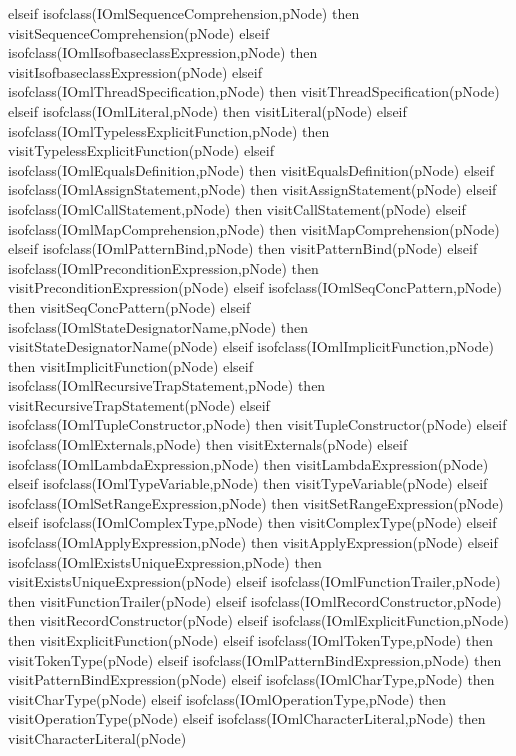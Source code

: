 \begin{vdm_al}
      elseif isofclass(IOmlSequenceComprehension,pNode) then visitSequenceComprehension(pNode)
      elseif isofclass(IOmlIsofbaseclassExpression,pNode) then visitIsofbaseclassExpression(pNode)
      elseif isofclass(IOmlThreadSpecification,pNode) then visitThreadSpecification(pNode)
      elseif isofclass(IOmlLiteral,pNode) then visitLiteral(pNode)
      elseif isofclass(IOmlTypelessExplicitFunction,pNode) then visitTypelessExplicitFunction(pNode)
      elseif isofclass(IOmlEqualsDefinition,pNode) then visitEqualsDefinition(pNode)
      elseif isofclass(IOmlAssignStatement,pNode) then visitAssignStatement(pNode)
      elseif isofclass(IOmlCallStatement,pNode) then visitCallStatement(pNode)
      elseif isofclass(IOmlMapComprehension,pNode) then visitMapComprehension(pNode)
      elseif isofclass(IOmlPatternBind,pNode) then visitPatternBind(pNode)
      elseif isofclass(IOmlPreconditionExpression,pNode) then visitPreconditionExpression(pNode)
      elseif isofclass(IOmlSeqConcPattern,pNode) then visitSeqConcPattern(pNode)
      elseif isofclass(IOmlStateDesignatorName,pNode) then visitStateDesignatorName(pNode)
      elseif isofclass(IOmlImplicitFunction,pNode) then visitImplicitFunction(pNode)
      elseif isofclass(IOmlRecursiveTrapStatement,pNode) then visitRecursiveTrapStatement(pNode)
      elseif isofclass(IOmlTupleConstructor,pNode) then visitTupleConstructor(pNode)
      elseif isofclass(IOmlExternals,pNode) then visitExternals(pNode)
      elseif isofclass(IOmlLambdaExpression,pNode) then visitLambdaExpression(pNode)
      elseif isofclass(IOmlTypeVariable,pNode) then visitTypeVariable(pNode)
      elseif isofclass(IOmlSetRangeExpression,pNode) then visitSetRangeExpression(pNode)
      elseif isofclass(IOmlComplexType,pNode) then visitComplexType(pNode)
      elseif isofclass(IOmlApplyExpression,pNode) then visitApplyExpression(pNode)
      elseif isofclass(IOmlExistsUniqueExpression,pNode) then visitExistsUniqueExpression(pNode)
      elseif isofclass(IOmlFunctionTrailer,pNode) then visitFunctionTrailer(pNode)
      elseif isofclass(IOmlRecordConstructor,pNode) then visitRecordConstructor(pNode)
      elseif isofclass(IOmlExplicitFunction,pNode) then visitExplicitFunction(pNode)
      elseif isofclass(IOmlTokenType,pNode) then visitTokenType(pNode)
      elseif isofclass(IOmlPatternBindExpression,pNode) then visitPatternBindExpression(pNode)
      elseif isofclass(IOmlCharType,pNode) then visitCharType(pNode)
      elseif isofclass(IOmlOperationType,pNode) then visitOperationType(pNode)
      elseif isofclass(IOmlCharacterLiteral,pNode) then visitCharacterLiteral(pNode)

\end{vdm_al}
